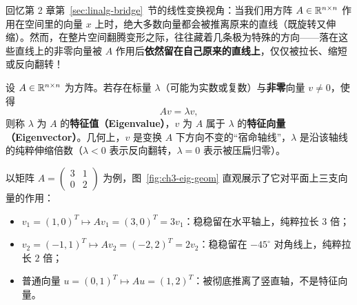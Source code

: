 回忆第 2 章第~\ref{sec:linalg-bridge}~节的线性变换视角：当我们用方阵 $A \in \mathbb{R}^{n\times n}$ 作用在空间里的向量 $x$ 上时，绝大多数向量都会被推离原来的直线（既旋转又伸缩）。然而，在整片空间翻腾变形之际，往往藏着几条极为特殊的方向——落在这些直线上的非零向量被 $A$ 作用后\textbf{依然留在自己原来的直线上}，仅仅被拉长、缩短或反向翻转！

\begin{defBox}
\begin{definition}[特征值与特征向量]\label{def:ch3-eigen}
设 $A \in \mathbb{R}^{n\times n}$ 为方阵。若存在标量 $\lambda$（可能为实数或复数）与\textbf{非零}向量 $v \neq 0$，使得
\begin{equation}\label{eq:ch3-eig-def}
  A v = \lambda v,
\end{equation}
则称 $\lambda$ 为 $A$ 的\textbf{特征值（Eigenvalue）}，$v$ 为 $A$ 属于 $\lambda$ 的\textbf{特征向量（Eigenvector）}。几何上，$v$ 是变换 $A$ 下方向不变的“宿命轴线”，$\lambda$ 是沿该轴线的纯粹伸缩倍数（$\lambda < 0$ 表示反向翻转，$\lambda = 0$ 表示被压扁归零）。
\end{definition}
\end{defBox}

以矩阵 $A = \begin{pmatrix} 3 & 1 \\ 0 & 2 \end{pmatrix}$ 为例，图~\ref{fig:ch3-eig-geom} 直观展示了它对平面上三支向量的作用：
\begin{itemize}
  \item $v_1 = (1, 0)^T \mapsto A v_1 = (3, 0)^T = 3v_1$：稳稳留在水平轴上，纯粹拉长 $3$ 倍；
  \item $v_2 = (-1, 1)^T \mapsto A v_2 = (-2, 2)^T = 2v_2$：稳稳留在 $-45^\circ$ 对角线上，纯粹拉长 $2$ 倍；
  \item 普通向量 $u = (0, 1)^T \mapsto A u = (1, 2)^T$：被彻底推离了竖直轴，不是特征向量。
\end{itemize}

